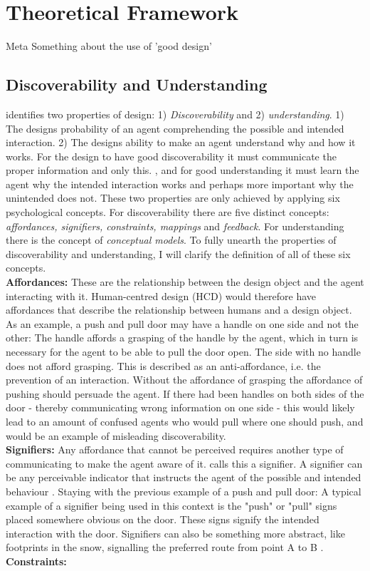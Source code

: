 \chapter{Theoretical Framework}

Meta
Something about the use of 'good design'

\section{Discoverability and Understanding}
 identifies two properties of design: 1) \textit{Discoverability} and 2) \textit{understanding}. 1) The designs probability of an agent comprehending the possible and intended interaction. 2) The designs ability to make an agent understand why and how it works. For the design to have good discoverability it must communicate the proper information and only this. , and for good understanding it must learn the agent why the intended interaction works and perhaps more important why the unintended does not. These two properties are only achieved by applying six psychological concepts. For discoverability there are five distinct concepts: \textit{affordances, signifiers, constraints, mappings} and \textit{feedback}. For understanding there is the concept of \textit{conceptual models}. To fully unearth the properties of discoverability and understanding, I will clarify the definition of all of these six concepts. \\
\textbf{Affordances:} These are the relationship between the design object and the agent interacting with it. Human-centred design (HCD) would therefore have affordances that describe the relationship between humans and a design object. As an example, a push and pull door may have a handle on one side and not the other: The handle affords a grasping of the handle by the agent, which in turn is necessary for the agent to be able to pull the door open. The side with no handle does not afford grasping. This is described as an anti-affordance, i.e. the prevention of an interaction. Without the affordance of grasping the affordance of pushing should persuade the agent. If there had been handles on both sides of the door - thereby communicating wrong information on one side - this would likely lead to an amount of confused agents who would pull where one should push, and would be an example of misleading discoverability. \cite{norman} \\
\textbf{Signifiers:} Any affordance that cannot be perceived requires another type of communicating to make the agent aware of it.  calls this a signifier. A signifier can be any perceivable indicator that instructs the agent of the possible and intended behaviour \cite{norman}. Staying with the previous example of a push and pull door: A typical example of a signifier being used in this context is the "push" or "pull" signs placed somewhere obvious on the door. These signs signify the intended interaction with the door. Signifiers can also be something more abstract, like footprints in the snow, signalling the preferred route from point A to B \cite{norman}. \\
\textbf{Constraints:}
\cite{norman} \cite{fullerton}

